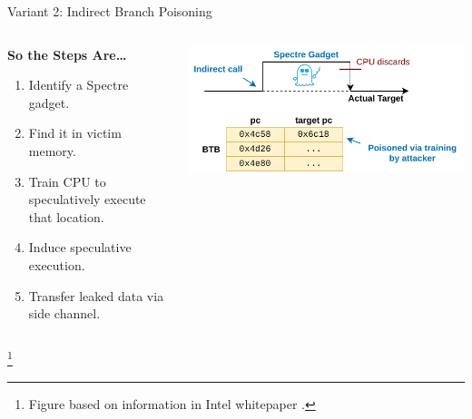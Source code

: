 \documentclass[10pt, dvipsnames, aspectratio=169]{beamer}
\newcommand\ufootnote[1]{%
    \begingroup
        \renewcommand\thefootnote{}\footnote{\hspace{-1.8em}#1}%
        \addtocounter{footnote}{-1}%
    \endgroup
}
\begin{document}
\begingroup
\setwatermark{}
\begin{frame}[c]{Variant 2: Indirect Branch Poisoning}{}
  \begin{columns}
    \begin{column}{0.5\textwidth}
      {\bf So the Steps Are\ldots}
      \begin{enumerate}
        \item Identify a Spectre gadget.
        \item Find it in victim memory.
        \item Train CPU to speculatively execute that location.
        \item Induce speculative execution.
        \item Transfer leaked data via side channel.
      \end{enumerate}
    \end{column}

    \begin{column}{0.5\textwidth}
      \color{black}%
      \includegraphics[width=1\columnwidth]{figs/indirect.pdf}%
    \end{column}
  \end{columns}

  \ufootnote{Figure based on information in Intel whitepaper \cite{intel_retpoline}.}
\end{frame}
\endgroup
\end{document}
